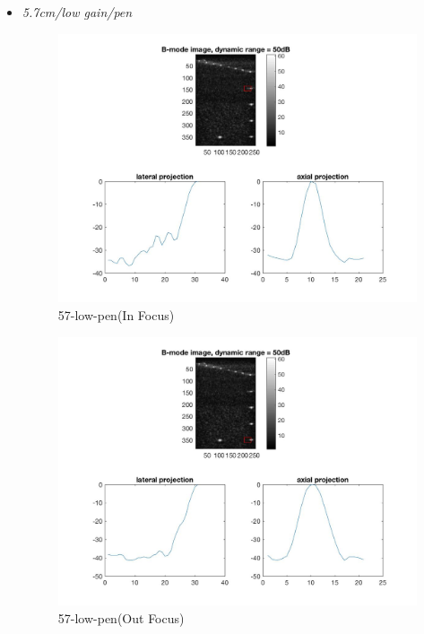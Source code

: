 \documentclass[12pts,a4paper]{article}
\begin{document}
\begin{itemize}
\item{\emph{5.7cm/low gain/pen}}
\begin{center}
\end{center}
\begin{figure}[h]
    \centering
    \includegraphics[width=1.0\textwidth]{img_hw1/57-low-pen1.jpg}
    \caption{57-low-pen(In Focus)}
    \label{fig:mesh1}
\end{figure}
\pagebreak
\begin{figure}[h]
    \centering
    \includegraphics[width=1.0\textwidth]{img_hw1/57-low-pen2.jpg}
    \caption{57-low-pen(Out Focus)}
    \label{fig:mesh1}
\end{figure}
\pagebreak

\end{itemize}
\end{document}
